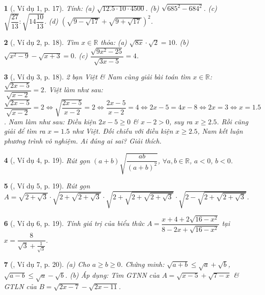 \documentclass{article}
\newtheorem{baitoan}{}%
\begin{document}
\begin{baitoan}[\cite{Binh_boi_duong_Toan_9_tap_1}, Ví dụ 1, p. 17]
	Tính: (a) $\sqrt{12.5\cdot10\cdot4500}$. (b) $\sqrt{685^2 - 684^2}$. (c) $\sqrt{\dfrac{27}{13}}:\sqrt{14\dfrac{10}{13}}$. (d) $\left(\sqrt{9 - \sqrt{17}} + \sqrt{9 + \sqrt{17}}\right)^2$.
\end{baitoan}

\begin{baitoan}[\cite{Binh_boi_duong_Toan_9_tap_1}, Ví dụ 2, p. 18]
	Tìm $x\in\mathbb{R}$ thỏa: (a) $\sqrt{8x}\cdot\sqrt{2} = 10$. (b) $\sqrt{x^2 - 9} - \sqrt{x + 3} = 0$. (c) $\dfrac{\sqrt{9x^2 - 25}}{\sqrt{3x - 5}} = 4$.
\end{baitoan}

\begin{baitoan}[\cite{Binh_boi_duong_Toan_9_tap_1}, Ví dụ 3, p. 18]
	2 bạn Việt \& Nam cùng giải bài toán tìm $x\in\mathbb{R}$: $\dfrac{\sqrt{2x - 5}}{\sqrt{x - 2}} = 2$. Việt làm như sau: $\dfrac{\sqrt{2x - 5}}{\sqrt{x - 2}} = 2\Leftrightarrow\sqrt{\dfrac{2x - 5}{x - 2}} = 2\Leftrightarrow\dfrac{2x - 5}{x - 2} = 4\Leftrightarrow2x - 5 = 4x - 8\Leftrightarrow2x = 3\Leftrightarrow x = 1.5$. Nam làm như sau: Điều kiện $2x - 5\ge0$ \& $x - 2> 0$, suy ra $x\ge2.5$. Rồi cũng giải để tìm ra $x = 1.5$ như Việt. Đối chiếu với điều kiện $x\ge2.5$, Nam kết luận phương trình vô nghiệm. Ai đúng ai sai? Giải thích.
\end{baitoan}

\begin{baitoan}[\cite{Binh_boi_duong_Toan_9_tap_1}, Ví dụ 4, p. 19]
	Rút gọn $(a + b)\sqrt{\dfrac{ab}{(a + b)^2}}$, $\forall a,b\in\mathbb{R}$, $a < 0$, $b < 0$.
\end{baitoan}

\begin{baitoan}[\cite{Binh_boi_duong_Toan_9_tap_1}, Ví dụ 5, p. 19]
	Rút gọn $A = \sqrt{2 + \sqrt{3}}\cdot \sqrt{2 + \sqrt{2 + \sqrt{3}}}\cdot\sqrt{2 + \sqrt{2 + \sqrt{2 + \sqrt{3}}}}\cdot\sqrt{2 - \sqrt{2 + \sqrt{2 + \sqrt{3}}}}$.
\end{baitoan}

\begin{baitoan}[\cite{Binh_boi_duong_Toan_9_tap_1}, Ví dụ 6, p. 19]
	Tính giá trị của biểu thức $A = \dfrac{x + 4 + 2\sqrt{16 - x^2}}{8 - 2x + \sqrt{16 - x^2}}$ tại $x = \dfrac{8}{\sqrt{3} + \frac{1}{\sqrt{3}}}$.
\end{baitoan}

\begin{baitoan}[\cite{Binh_boi_duong_Toan_9_tap_1}, Ví dụ 7, p. 20]
	(a) Cho $a\ge b\ge0$. Chứng minh: $\sqrt{a + b}\le\sqrt{a} + \sqrt{b}$, $\sqrt{a - b}\le\sqrt{a} - \sqrt{b}$. (b) Áp dụng: Tìm {\rm {\rm GTNN}} của $A = \sqrt{x - 5} + \sqrt{7 - x}$ \& {\rm GTLN} của $B = \sqrt{2x - 7} - \sqrt{2x - 11}$.
\end{baitoan}
\end{document}
